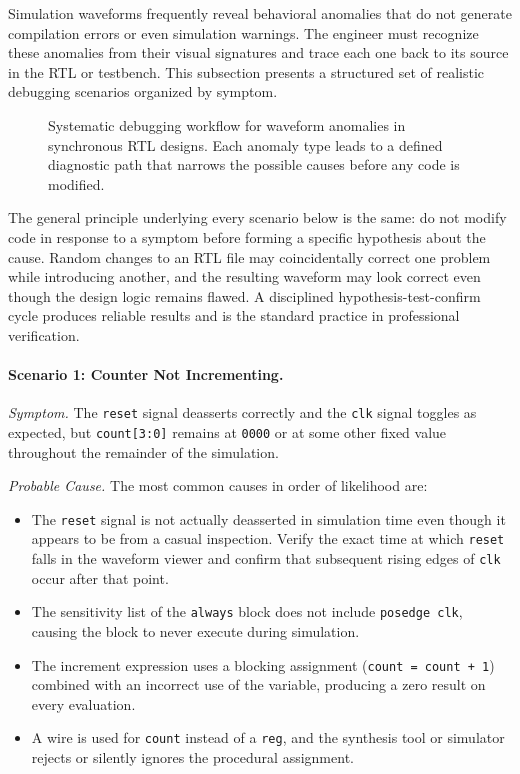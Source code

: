 Simulation waveforms frequently reveal behavioral anomalies that do not
generate compilation errors or even simulation warnings. The engineer must
recognize these anomalies from their visual signatures and trace each one
back to its source in the RTL or testbench. This subsection presents
a structured set of realistic debugging scenarios organized by symptom.

\begin{figure}[h]
\centering
\caption{Systematic debugging workflow for waveform anomalies in synchronous
         RTL designs. Each anomaly type leads to a defined diagnostic path
         that narrows the possible causes before any code is modified.}
\label{fig:debug-workflow}
\end{figure}

The general principle underlying every scenario below is the same: do not
modify code in response to a symptom before forming a specific hypothesis
about the cause. Random changes to an RTL file may coincidentally correct
one problem while introducing another, and the resulting waveform may look
correct even though the design logic remains flawed. A disciplined
hypothesis-test-confirm cycle produces reliable results and is the standard
practice in professional verification.

\paragraph{Scenario 1: Counter Not Incrementing.}

\textit{Symptom.} The \texttt{reset} signal deasserts correctly and the
\texttt{clk} signal toggles as expected, but \texttt{count[3:0]} remains
at \texttt{0000} or at some other fixed value throughout the remainder of
the simulation.

\textit{Probable Cause.} The most common causes in order of likelihood are:
\begin{itemize}
    \item The \texttt{reset} signal is not actually deasserted in simulation
          time even though it appears to be from a casual inspection. Verify
          the exact time at which \texttt{reset} falls in the waveform viewer
          and confirm that subsequent rising edges of \texttt{clk} occur after
          that point.
    \item The sensitivity list of the \texttt{always} block does not include
          \texttt{posedge clk}, causing the block to never execute during
          simulation.
    \item The increment expression uses a blocking assignment
          (\texttt{count = count + 1}) combined with an incorrect use of
          the variable, producing a zero result on every evaluation.
    \item A wire is used for \texttt{count} instead of a \texttt{reg}, and
          the synthesis tool or simulator rejects or silently ignores the
          procedural assignment.
\end{itemize}

